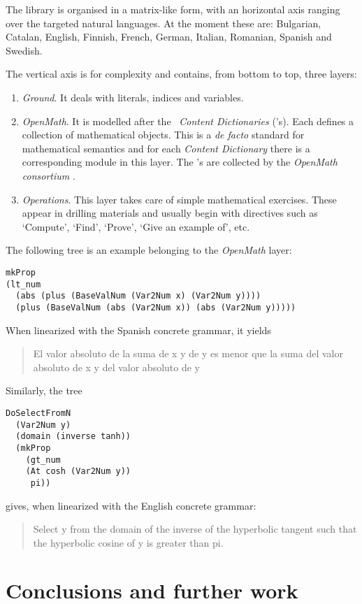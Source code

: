 \documentclass[adraft,copyright,creativecommons]{eptcs}
\begin{document}
The library is organised in a matrix-like form, with an horizontal axis
ranging over the targeted natural languages.  At the moment these are:
Bulgarian,
Catalan, English, Finnish, French, German, Italian, Romanian, Spanish and
Swedish.

The vertical axis is for complexity and contains, from bottom to top, three
layers:

\begin{enumerate}
	\item\emph{Ground}. It deals with literals, indices and variables.
	\item\emph{OpenMath}. It is modelled after the \openmath\ \emph{Content
Dictionaries} (\CD's). Each \CD{} defines a collection of
mathematical objects. This is a \emph{de facto} standard for mathematical
semantics and for each \emph{Content Dictionary}
there is a corresponding module in this layer.
The \CD's are collected by the
\emph{OpenMath consortium} \cite{OpenMath}.
	\item\emph{Operations}.
This layer takes care of simple mathematical exercises. These appear
in drilling materials and usually begin with directives such as
`Compute', `Find', `Prove', `Give an example of', etc.
\end{enumerate}

The following tree is an example belonging to the \emph{OpenMath} layer:
\begin{lstlisting}
mkProp
(lt_num
  (abs (plus (BaseValNum (Var2Num x) (Var2Num y))))
  (plus (BaseValNum (abs (Var2Num x)) (abs (Var2Num y)))))
\end{lstlisting}
When linearized with the Spanish concrete grammar, it yields
\begin{quote}
El valor absoluto de la suma  de x y de y es menor que la suma del valor
absoluto  de x y del valor absoluto de y
\end{quote}
\noindent Similarly, the tree
\begin{lstlisting}
DoSelectFromN
  (Var2Num y)
  (domain (inverse tanh))
  (mkProp
    (gt_num
    (At cosh (Var2Num y))
     pi))
\end{lstlisting}
gives, when linearized with the English concrete grammar:
\begin{quote}
Select y from the domain of the inverse of the hyperbolic tangent such that
the hyperbolic cosine of y is greater than pi.
\end{quote}


\section{Conclusions and further work} %
\label{sec:conclusions}
\end{document}
